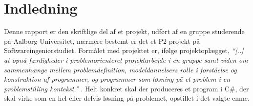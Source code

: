 \chapter{Indledning}\label{chap:indledning}



Denne rapport er den skriftlige del af et projekt, udført af en gruppe studerende på Aalborg Universitet, nærmere bestemt er det et P2 projekt på Softwareingeniørstudiet. 
Formålet med projektet er, ifølge projektoplægget, \textit{``[..] at opnå færdigheder i problemorienteret projektarbejde i en gruppe samt viden om sammenhænge mellem problemdefinition, modeldannelsers rolle i forståelse og konstruktion af programmer, og
programmer som løsning på et problem i en problemstilling kontekst.''} \citep{projektkatalog}. 
Helt konkret skal der produceres et program i C\#, der skal virke som en hel eller delvis løsning på problemet, opstillet i det valgte emne.

